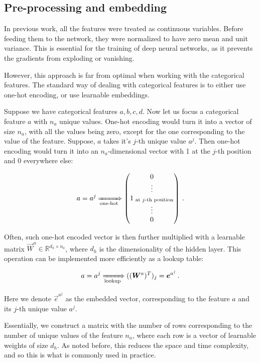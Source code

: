 \subsection{Pre-processing and embedding}


In previous work, all the features were treated as continuous variables. Before feeding them to the network, they were
normalized to have zero mean and unit variance. This is essential for the training of deep neural networks, as it
prevents the gradients from exploding or vanishing.

However, this approach is far from optimal when working with the categorical features. The standard way of dealing with
categorical features is to either use one-hot encoding, or use learnable embeddings.

Suppose we have categorical features $a, b, c, d$. Now let us focus a categorical feature $a$ with $n_a$ unique values.
One-hot encoding would turn it into a vector of size $n_a$, with all the values being zero, except for the one
corresponding to the value of the feature. Suppose, $a$ takes it's $j$-th unique value $a^j$. Then one-hot encoding
would turn it into an $n_a$-dimensional vector with 1 at the $j$-th position and 0 everywhere else:

\begin{equation}
    a = a^j \xRightarrow[\text{one-hot}]{} \begin{pmatrix}
        0 \\ \vdots \\ 1_\text{ at  $j$-th position} \\ \vdots \\ 0
    \end{pmatrix}\,.
\end{equation}


Often, such one-hot encoded vector is then further multiplied with a learnable matrix $\vec{W}^a \in \mathbb{R}^{d_h
        \times n_a}$, where $d_h$ is the dimensionality of the hidden layer. This operation can be implemented more
efficiently as a lookup table:

\begin{equation}
    a = a^j \xRightarrow[\text{lookup}]{} ((\vec{W}^a)^T)_j = \vec{e}^{a^j}\,.
\end{equation}

Here we denote $\vec{e}^{a^j}$ as the embedded vector, corresponding to the feature $a$ and its $j$-th unique value
$a^j$.

Essentially, we construct a matrix with the number of rows corresponding to the number of unique values of the feature
$n_a$, where each row is a vector of learnable weights of size $d_h$. As noted before, this reduces the space and time
complexity, and so this is what is commonly used in practice.

